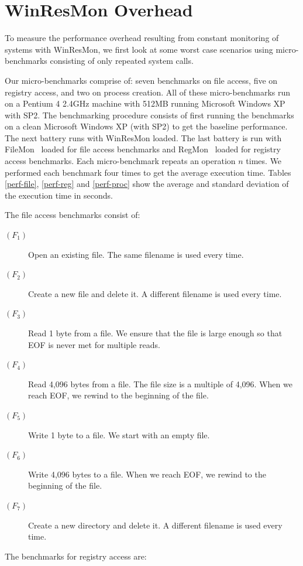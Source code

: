 \section{WinResMon Overhead}

To measure the performance overhead resulting from constant
monitoring of systems with WinResMon,  we first look at some
worst case scenarios using micro-benchmarks consisting of only
repeated system calls.

Our micro-benchmarks comprise of: seven benchmarks on file access, five on registry access, and
two on process creation.  All of these micro-benchmarks run on a
Pentium 4 2.4GHz machine with 512MB running Microsoft Windows XP with SP2.
The benchmarking procedure consists of first running the benchmarks on a 
clean Microsoft Windows XP (with SP2) to get the baseline performance. The 
next battery runs with WinResMon loaded. The last battery is run with 
FileMon~\cite{filemon} loaded for file access benchmarks and RegMon~\cite{regmon} 
loaded for registry access benchmarks. Each micro-benchmark repeats an operation $n$ times. 
We performed each benchmark four times to get the average execution time.
Tables \ref{perf-file}, \ref{perf-reg} and \ref{perf-proc} show the average and standard 
deviation of the execution time in seconds.

The file access benchmarks consist of:

\begin{description}
\item[$(F_1)$] Open an existing file.  The same filename is used every time.
\item[$(F_2)$] Create a new file and delete it.  A different filename is used
every time. 
\item[$(F_3)$] Read 1 byte from a file. We ensure that the file is large
enough so that EOF is never met for multiple reads.
\item[$(F_4)$] Read 4,096 bytes from a file.  The file size is a multiple of
4,096. When we reach EOF, we rewind to the beginning of the file.
\item[$(F_5)$] Write 1 byte to a file.  We start with an empty file.
\item[$(F_6)$] Write 4,096 bytes to a file.  When we reach EOF, we rewind to
the beginning of the file. 
\item[$(F_7)$] Create a new directory and delete it. A different filename is
used every time. 
\end{description}

The benchmarks for registry access are:

